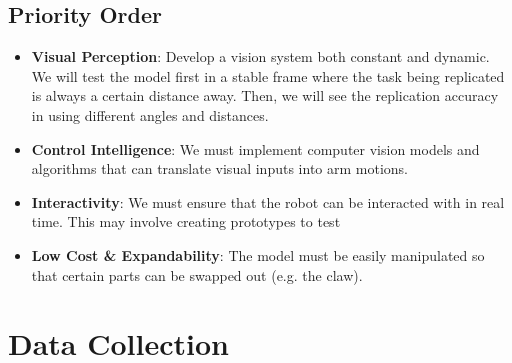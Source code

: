 \documentclass[document]{llncs}
\begin{document}
\subsection{Priority Order}
\begin{center}
  \begin{minipage}{0.8\textwidth}
    \begin{itemize}
      \item \textbf{Visual Perception}: Develop a vision system both constant and dynamic. We will test the model first in a stable frame where the task being replicated is always a certain distance away. Then, we will see the replication accuracy in using different angles and distances.
      \item \textbf{Control Intelligence}: We must implement computer vision models and algorithms that can translate visual inputs into arm motions.
      \item \textbf{Interactivity}: We must ensure that the robot can be interacted with in real time. This may involve creating prototypes to test 
      \item \textbf{Low Cost \& Expandability}: The model must be easily manipulated so that certain parts can be swapped out (e.g. the claw).
    \end{itemize}
  \end{minipage}
\end{center}

\section{Data Collection}
\end{document}
